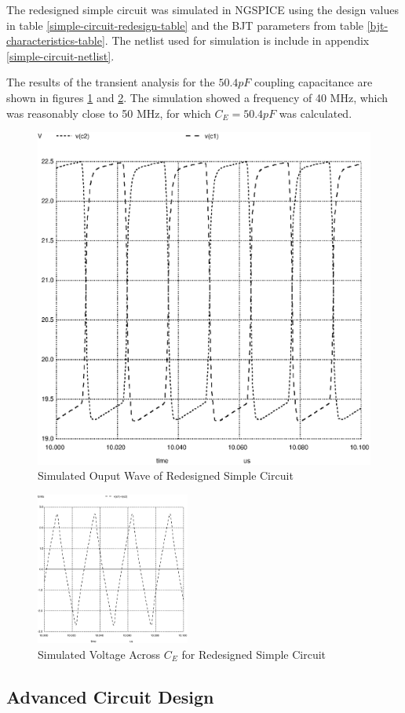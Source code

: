 \documentclass[titlepage, letterpaper, 10.5pt]{article}
\begin{document}
The redesigned simple circuit was simulated in NGSPICE using the design values in table
\ref{simple-circuit-redesign-table} and the BJT parameters from table
\ref{bjt-characteristics-table}. The netlist used for simulation is include in appendix
\ref{simple-circuit-netlist}.

The results of the transient analysis for the
$50.4pF$ coupling capacitance are shown in figures \ref{simple-circuit-output-50pF}
and \ref{simple-circuit-vcap-50pF}. The simulation showed a frequency of 40 MHz,
which was reasonably close to 50 MHz, for which $C_{E}=50.4pF$ was calculated.

\begin{figure}[ht]
	\centering
	\includegraphics[width=.45\textwidth]{ngspice/simple-circuit-output-50pF}
	\caption{Simulated Ouput Wave of Redesigned Simple Circuit}
	\label{simple-circuit-output-50pF}
\end{figure}

\begin{figure}[ht]
	\centering
	\includegraphics[width=0.45\textwidth]{ngspice/simple-circuit-vcap-50pF}
	\caption{Simulated Voltage Across $C_{E}$ for Redesigned Simple Circuit}
	\label{simple-circuit-vcap-50pF}
\end{figure}

\clearpage
\subsection{Advanced Circuit Design}
\end{document}
